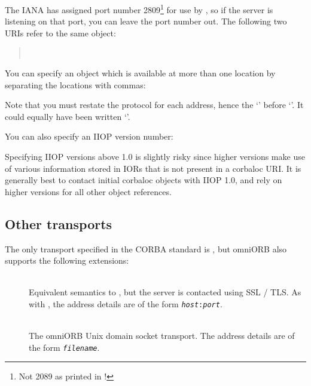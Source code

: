 \documentclass[11pt,oneside,a4paper]{book}
\newcommand{\code}[1]{\texttt{#1}}
\begin{document}
\noindent The IANA has assigned port number 2809\footnote{Not 2089 as
printed in \cite{inschapters}!} for use by , so if
the server is listening on that port, you can leave the port number
out.  The following two URIs refer to the same object:

\begin{quote}
\\
\end{quote}

\noindent You can specify an object which is available at more than
one location by separating the locations with commas:

\begin{quote}
\end{quote}

\noindent Note that you must restate the protocol for each address,
hence the `\corbauri{:}' before `'. It could
equally have been written `'.

You can also specify an IIOP version number:

\begin{quote}
\end{quote}

\noindent Specifying IIOP versions above 1.0 is slightly risky since
higher versions make use of various information stored in IORs that is
not present in a corbaloc URI. It is generally best to contact initial
corbaloc objects with IIOP 1.0, and rely on higher versions for all
other object references.



\subsection{Other transports}

The only transport specified in the CORBA standard is ,
but omniORB also supports the following extensions:

\begin{description}

\item[]\mbox{}\\
Equivalent semantics to , but the server is contacted
using SSL / TLS. As with , the address details are of
the form \code{\textit{host}:\textit{port}}.

\item[]\mbox{}\\
The omniORB Unix domain socket transport. The address details are of
the form \code{\textit{filename}}.

\end{description}
\end{document}
